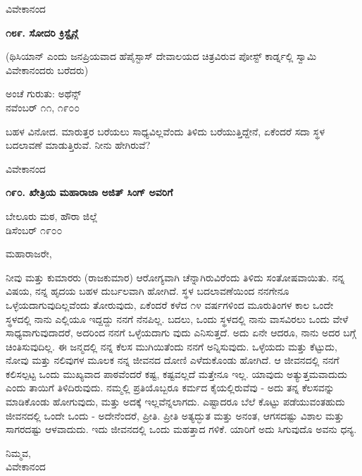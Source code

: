 \begin{flushright}
ವಿವೇಕಾನಂದ
\end{flushright}

\begin{center}
\textbf{೧೮೯. ಸೋದರಿ ಕ್ರಿಸ್ಟೈನ್ಗೆ}
\end{center}

(ಥಿಸಿಯಾನ್ ಎಂದು ಜನಪ್ರಿಯವಾದ ಹೆಪೈಸ್ಟಾಸ್ ದೇವಾಲಯದ ಚಿತ್ರವಿರುವ ಪೋಸ್ಟ್ ಕಾರ್ಡ್ನಲ್ಲಿ ಸ್ವಾಮಿ ವಿವೇಕಾನಂದರು ಬರೆದರು)

\begin{flushright}
ಅಂಚೆ ಗುರುತು: ಅಥೆನ್ಸ್\\ನವೆಂಬರ್ ೧೧, ೧೯೦೦
\end{flushright}

ಬಹಳ ವಿನೋದ. ಮಾರುತ್ತರ ಬರೆಯಲು ಸಾಧ್ಯವಿಲ್ಲವೆಂದು ತಿಳಿದು ಬರೆಯುತ್ತಿದ್ದೇನೆ, ಏಕೆಂದರೆ ಸದಾ ಸ್ಥಳ ಬದಲಾವಣೆ ಮಾಡುತ್ತಿರುವೆ. ನೀನು ಹೇಗಿರುವೆ?

\begin{flushright}
ವಿವೇಕಾನಂದ
\end{flushright}

\begin{center}
\textbf{೧೯೦. ಖೇತ್ರಿಯ ಮಹಾರಾಜಾ ಅಜಿತ್ ಸಿಂಗ್ ಅವರಿಗೆ}
\end{center}

\begin{flushright}
ಬೇಲೂರು ಮಠ, ಹೌರಾ ಜಿಲ್ಲೆ\\ಡಿಸೆಂಬರ್ ೧೯೦೦
\end{flushright}

ಮಹಾರಾಜರೇ,

ನೀವು ಮತ್ತು ಕುಮಾರರು (ರಾಜಕುಮಾರ) ಆರೋಗ್ಯವಾಗಿ ಚೆನ್ನಾಗಿರುವಿರೆಂದು ತಿಳಿದು ಸಂತೋಷವಾಯಿತು. ನನ್ನ ವಿಷಯ, ನನ್ನ ಹೃದಯ ಬಹಳ ದುರ್ಬಲವಾಗಿ ಹೋಗಿದೆ. ಸ್ಥಳ ಬದಲಾವಣೆಯಿಂದ ನನಗೇನೂ ಒಳ್ಳೆಯದಾಗುವುದಿಲ್ಲವೆಂದು ತೋರುವುದು, ಏಕೆಂದರೆ ಕಳೆದ ೧೪ ವರ್ಷಗಳಿಂದ ಮೂರುತಿಂಗಳ ಕಾಲ ಒಂದೇ ಸ್ಥಳದಲ್ಲಿ ನಾನು ಎಲ್ಲಿಯೂ ಇದ್ದದ್ದು ನನಗೆ ನೆನಪಿಲ್ಲ. ಬದಲು, ಒಂದು ಸ್ಥಳದಲ್ಲಿ ನಾನು ವಾಸವಿರಲು ಒಂದು ವೇಳೆ ಸಾಧ್ಯವಾಗುವುದಾದರೆ, ಅದರಿಂದ ನನಗೆ ಒಳ್ಳೆಯದಾಗು ವುದು ಎನಿಸುತ್ತದೆ. ಅದು ಏನೇ ಆದರೂ, ನಾನು ಅದರ ಬಗ್ಗೆ ಚಿಂತಿಸುವುದಿಲ್ಲ. ಈ ಜನ್ಮದಲ್ಲಿ ನನ್ನ ಕೆಲಸ ಮುಗಿಯಿತೆಂದು ನನಗೆ ಅನ್ನಿಸುವುದು. ಒಳ್ಳೆಯದು ಮತ್ತು ಕೆಟ್ಟುದು, ನೋವು ಮತ್ತು ನಲಿವುಗಳ ಮೂಲಕ ನನ್ನ ಜೀವನದ ದೋಣಿ ಎಳೆದುಕೊಂಡು ಹೋಗಿದೆ. ಆ ಜೀವನದಲ್ಲಿ ನನಗೆ ಕಲಿಸಲ್ಪಟ್ಟ ಒಂದು ಮುಖ್ಯವಾದ ಪಾಠವೆಂದರೆ ಕಷ್ಟ, ಕಷ್ಟವಲ್ಲದೆ ಮತ್ತೇನೂ ಇಲ್ಲ. ಯಾವುದು ಅತ್ಯುತ್ತಮವಾದುದು ಎಂದು ತಾಯಿಗೆ ತಿಳಿದಿರುವುದು. ನಮ್ಮಲ್ಲಿ ಪ್ರತಿಯೊಬ್ಬರೂ ಕರ್ಮದ ಕೈಯಲ್ಲಿರುವೆವು - ಅದು ತನ್ನ ಕೆಲಸವನ್ನು ಮಾಡಿಕೊಂಡು ಹೋಗುವುದು, ಮತ್ತು ಅದಕ್ಕೆ ಇಲ್ಲವೆನ್ನಲಾಗದು. ಎಷ್ಟಾದರೂ ಬೆಲೆ ಕೊಟ್ಟು ಪಡೆಯುವಂತಹುದು ಜೀವನದಲ್ಲಿ ಒಂದೇ ಒಂದು - ಅದೇನೆಂದರೆ, ಪ್ರೀತಿ. ಪ್ರೀತಿ ಅತ್ಯದ್ಭುತ ಮತ್ತು ಅನಂತ, ಆಗಸದಷ್ಟು ವಿಶಾಲ ಮತ್ತು ಸಾಗರದಷ್ಟು ಆಳವಾದುದು. ಇದು ಜೀವನದಲ್ಲಿ ಒಂದು ಮಹತ್ತಾದ ಗಳಿಕೆ. ಯಾರಿಗೆ ಅದು ಸಿಗುವುದೊ ಅವನು ಧನ್ಯ.

\begin{flushright}
ನಿಮ್ಮವ,\\ವಿವೇಕಾನಂದ
\end{flushright}

